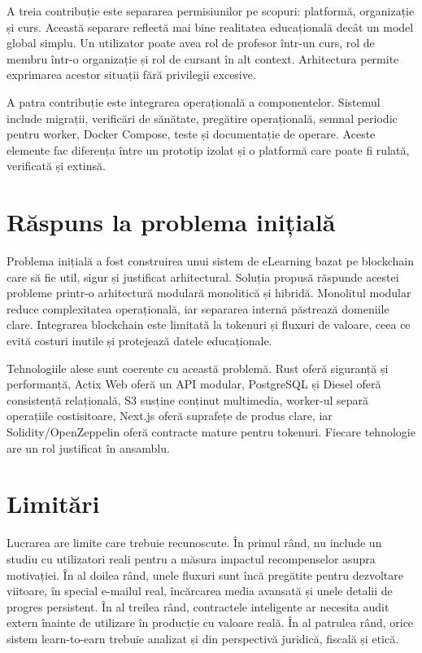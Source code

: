 A treia contribuție este separarea permisiunilor pe scopuri: platformă, organizație și curs. Această separare reflectă mai bine realitatea educațională decât un model global simplu. Un utilizator poate avea rol de profesor într-un curs, rol de membru într-o organizație și rol de cursant în alt context. Arhitectura permite exprimarea acestor situații fără privilegii excesive.

A patra contribuție este integrarea operațională a componentelor. Sistemul include migrații, verificări de sănătate, pregătire operațională, semnal periodic pentru worker, Docker Compose, teste și documentație de operare. Aceste elemente fac diferența între un prototip izolat și o platformă care poate fi rulată, verificată și extinsă.

\section{Răspuns la problema inițială}
Problema inițială a fost construirea unui sistem de eLearning bazat pe blockchain care să fie util, sigur și justificat arhitectural. Soluția propusă răspunde acestei probleme printr-o arhitectură modulară monolitică și hibridă. Monolitul modular reduce complexitatea operațională, iar separarea internă păstrează domeniile clare. Integrarea blockchain este limitată la tokenuri și fluxuri de valoare, ceea ce evită costuri inutile și protejează datele educaționale.

Tehnologiile alese sunt coerente cu această problemă. Rust oferă siguranță și performanță, Actix Web oferă un API modular, PostgreSQL și Diesel oferă consistență relațională, S3 susține conținut multimedia, worker-ul separă operațiile costisitoare, Next.js oferă suprafețe de produs clare, iar Solidity/OpenZeppelin oferă contracte mature pentru tokenuri. Fiecare tehnologie are un rol justificat în ansamblu.

\section{Limitări}
Lucrarea are limite care trebuie recunoscute. În primul rând, nu include un studiu cu utilizatori reali pentru a măsura impactul recompenselor asupra motivației. În al doilea rând, unele fluxuri sunt încă pregătite pentru dezvoltare viitoare, în special e-mailul real, încărcarea media avansată și unele detalii de progres persistent. În al treilea rând, contractele inteligente ar necesita audit extern înainte de utilizare în producție cu valoare reală. În al patrulea rând, orice sistem learn-to-earn trebuie analizat și din perspectivă juridică, fiscală și etică.

